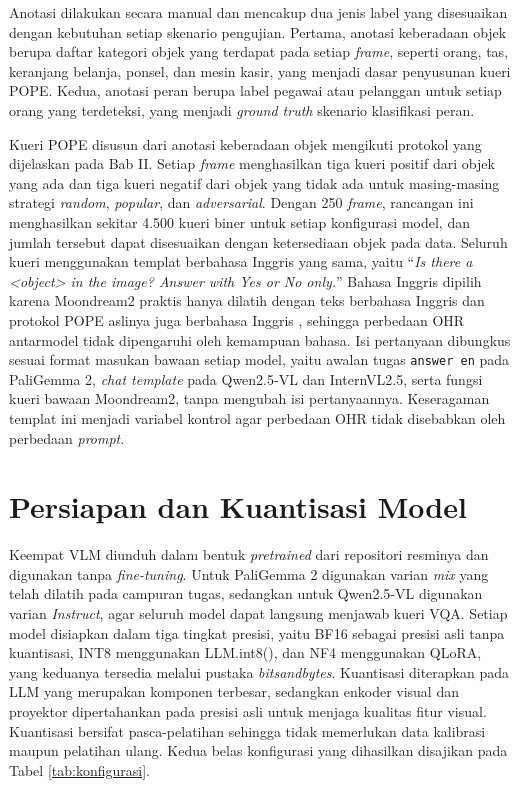 Anotasi dilakukan secara manual dan mencakup dua jenis label yang disesuaikan dengan kebutuhan setiap skenario pengujian. Pertama, anotasi keberadaan objek berupa daftar kategori objek yang terdapat pada setiap \textit{frame}, seperti orang, tas, keranjang belanja, ponsel, dan mesin kasir, yang menjadi dasar penyusunan kueri POPE. Kedua, anotasi peran berupa label pegawai atau pelanggan untuk setiap orang yang terdeteksi, yang menjadi \textit{ground truth} skenario klasifikasi peran.

Kueri POPE disusun dari anotasi keberadaan objek mengikuti protokol yang dijelaskan pada Bab II. Setiap \textit{frame} menghasilkan tiga kueri positif dari objek yang ada dan tiga kueri negatif dari objek yang tidak ada untuk masing-masing strategi \textit{random}, \textit{popular}, dan \textit{adversarial}. Dengan 250 \textit{frame}, rancangan ini menghasilkan sekitar 4.500 kueri biner untuk setiap konfigurasi model, dan jumlah tersebut dapat disesuaikan dengan ketersediaan objek pada data. Seluruh kueri menggunakan templat berbahasa Inggris yang sama, yaitu ``\textit{Is there a \textless object\textgreater{} in the image? Answer with Yes or No only.}'' Bahasa Inggris dipilih karena Moondream2 praktis hanya dilatih dengan teks berbahasa Inggris dan protokol POPE aslinya juga berbahasa Inggris \cite{ref9}, sehingga perbedaan OHR antarmodel tidak dipengaruhi oleh kemampuan bahasa. Isi pertanyaan dibungkus sesuai format masukan bawaan setiap model, yaitu awalan tugas \texttt{answer en} pada PaliGemma 2, \textit{chat template} pada Qwen2.5-VL dan InternVL2.5, serta fungsi kueri bawaan Moondream2, tanpa mengubah isi pertanyaannya. Keseragaman templat ini menjadi variabel kontrol agar perbedaan OHR tidak disebabkan oleh perbedaan \textit{prompt}.

\section{Persiapan dan Kuantisasi Model}
\label{sec:persiapan}
Keempat VLM diunduh dalam bentuk \textit{pretrained} dari repositori resminya dan digunakan tanpa \textit{fine-tuning}. Untuk PaliGemma 2 digunakan varian \textit{mix} yang telah dilatih pada campuran tugas, sedangkan untuk Qwen2.5-VL digunakan varian \textit{Instruct}, agar seluruh model dapat langsung menjawab kueri VQA. Setiap model disiapkan dalam tiga tingkat presisi, yaitu BF16 sebagai presisi asli tanpa kuantisasi, INT8 menggunakan LLM.int8(), dan NF4 menggunakan QLoRA, yang keduanya tersedia melalui pustaka \textit{bitsandbytes}. Kuantisasi diterapkan pada LLM yang merupakan komponen terbesar, sedangkan enkoder visual dan proyektor dipertahankan pada presisi asli untuk menjaga kualitas fitur visual. Kuantisasi bersifat pasca-pelatihan sehingga tidak memerlukan data kalibrasi maupun pelatihan ulang. Kedua belas konfigurasi yang dihasilkan disajikan pada Tabel \ref{tab:konfigurasi}.

